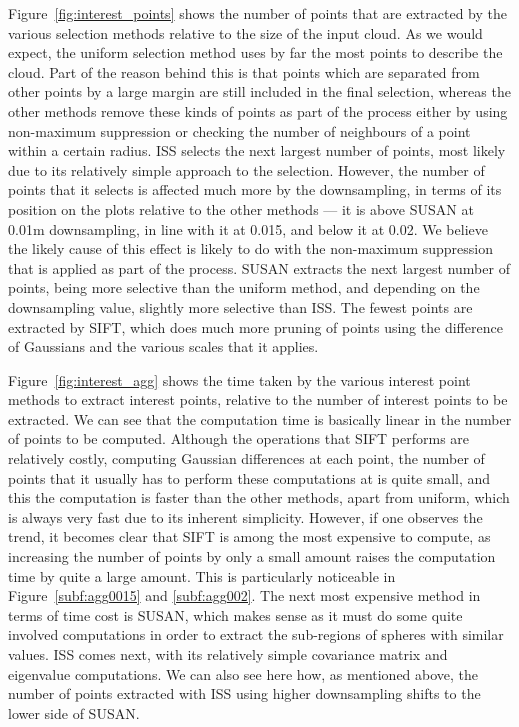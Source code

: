 \documentclass[11pt,a4paper]{kth-mag}
\begin{document}
Figure~\ref{fig:interest_points} shows the number of points that are extracted
by the various selection methods relative to the size of the input cloud. As we
would expect, the uniform selection method uses by far the most points to
describe the cloud. Part of the reason behind this is that points which are
separated from other points by a large margin are still included in the final
selection, whereas the other methods remove these kinds of points as part of the
process either by using non-maximum suppression or checking the number of
neighbours of a point within a certain radius. ISS selects the next largest
number of points, most likely due to its relatively simple approach to the
selection. However, the number of points that it selects is affected much more
by the downsampling, in terms of its position on the plots relative to the other
methods --- it is above SUSAN at 0.01m downsampling, in line with it at 0.015,
and below it at 0.02. We believe the likely cause of this effect is likely to do
with the non-maximum suppression that is applied as part of the process. SUSAN
extracts the next largest number of points, being more selective than the
uniform method, and depending on the downsampling value, slightly more selective
than ISS. The fewest points are extracted by SIFT, which does much more pruning
of points using the difference of Gaussians and the various scales that it
applies.

Figure~\ref{fig:interest_agg} shows the time taken by the various interest point
methods to extract interest points, relative to the number of interest points to
be extracted. We can see that the computation time is basically linear in the
number of points to be computed. Although the operations that SIFT performs are
relatively costly, computing Gaussian differences at each point, the number of
points that it usually has to perform these computations at is quite small, and
this the computation is faster than the other methods, apart from uniform, which
is always very fast due to its inherent simplicity. However, if one observes the
trend, it becomes clear that SIFT is among the most expensive to compute, as
increasing the number of points by only a small amount raises the computation
time by quite a large amount. This is particularly noticeable in
Figure~\ref{subf:agg0015} and \ref{subf:agg002}. The next most expensive method
in terms of time cost is SUSAN, which makes sense as it must do some quite
involved computations in order to extract the sub-regions of spheres with
similar values. ISS comes next, with its relatively simple covariance matrix and
eigenvalue computations. We can also see here how, as mentioned above, the
number of points extracted with ISS using higher downsampling shifts to the
lower side of SUSAN.
\end{document}
